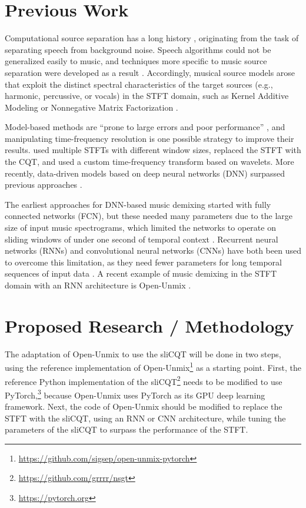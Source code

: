 \documentclass[letter,12pt]{article}
\begin{document}
\section{Previous Work}

Computational source separation has a long history \parencite{musicsepgood}, originating from the task of separating speech from background noise. Speech algorithms could not be generalized easily to music, and techniques more specific to music source separation were developed as a result \parencite{musicsepintro1}. Accordingly, musical source models arose that exploit the distinct spectral characteristics of the target sources (e.g., harmonic, percussive, or vocals) in the STFT domain, such as Kernel Additive Modeling or Nonnegative Matrix Factorization \parencite{musicsepgood}.

Model-based methods are ``prone to large errors and poor performance'' \parencite[13]{musicsepintro1}, and manipulating time-frequency resolution is one possible strategy to improve their results. \textcite{driedger} used multiple STFTs with different window sizes, \textcite{fitzgerald2} replaced the STFT with the CQT, and \textcite{wavelets} used a custom time-frequency transform based on wavelets. More recently, data-driven models based on deep neural networks (DNN) surpassed previous approaches \parencite{sisec2018, musicsepintro1}.

The earliest approaches for DNN-based music demixing started with fully connected networks (FCN), but these needed many parameters due to the large size of input music spectrograms, which limited the networks to operate on sliding windows of under one second of temporal context \parencite{musicsepgood}. Recurrent neural networks (RNNs) \parencite{umxorig1} and convolutional neural networks (CNNs) \parencite{plumbley1} have both been used to overcome this limitation, as they need fewer parameters for long temporal sequences of input data \parencite{musicsepgood}. A recent example of music demixing in the STFT domain with an RNN architecture is Open-Unmix \parencite{umx}.

\section{Proposed Research / Methodology}

The adaptation of Open-Unmix to use the sliCQT will be done in two steps, using the reference implementation of Open-Unmix\footnote{\url{https://github.com/sigsep/open-unmix-pytorch}} as a starting point. First, the reference Python implementation of the sliCQT\footnote{\url{https://github.com/grrrr/nsgt}} needs to be modified to use PyTorch,\footnote{\url{https://pytorch.org}} because Open-Unmix uses PyTorch as its GPU deep learning framework. Next, the code of Open-Unmix should be modified to replace the STFT with the sliCQT, using an RNN or CNN architecture, while tuning the parameters of the sliCQT to surpass the performance of the STFT.
\end{document}

